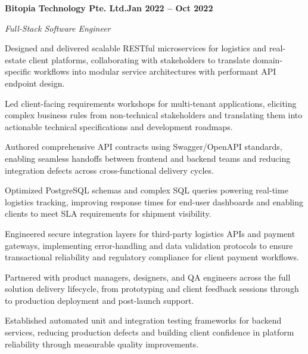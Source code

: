 \documentclass[letterpaper,10pt]{article}
\newcommand{\headingBf}[2]{\par\noindent\hspace*{10pt}\textbf{#1}\hfill\textbf{#2}}
\newcommand{\headingIt}[2]{\par\noindent\hspace*{10pt}\textit{#1}\hfill\textit{#2}}
\newenvironment{resume_list}{\vspace{-7pt}\begin{itemize}[itemsep=-2px, parsep=1pt, leftmargin=30pt]}{\end{itemize}}
\begin{document}
  \headingBf{Bitopia Technology Pte. Ltd.}{Jan 2022 -- Oct 2022}
  \headingIt{Full-Stack Software Engineer}{}
  \begin{resume_list}
    \item Designed and delivered scalable RESTful microservices for logistics and real-estate client platforms, collaborating with stakeholders to translate domain-specific workflows into modular service architectures with performant API endpoint design.
    \item Led client-facing requirements workshops for multi-tenant applications, eliciting complex business rules from non-technical stakeholders and translating them into actionable technical specifications and development roadmaps.
    \item Authored comprehensive API contracts using Swagger/OpenAPI standards, enabling seamless handoffs between frontend and backend teams and reducing integration defects across cross-functional delivery cycles.
    \item Optimized PostgreSQL schemas and complex SQL queries powering real-time logistics tracking, improving response times for end-user dashboards and enabling clients to meet SLA requirements for shipment visibility.
    \item Engineered secure integration layers for third-party logistics APIs and payment gateways, implementing error-handling and data validation protocols to ensure transactional reliability and regulatory compliance for client payment workflows.
    \item Partnered with product managers, designers, and QA engineers across the full solution delivery lifecycle, from prototyping and client feedback sessions through to production deployment and post-launch support.
    \item Established automated unit and integration testing frameworks for backend services, reducing production defects and building client confidence in platform reliability through measurable quality improvements.
  \end{resume_list}
\end{document}
